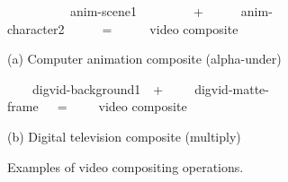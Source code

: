 \begin{figure}[t]
\begin{minipage}{1.1in}
\vspace{-4pt}
\vspace{2pt}
\end{minipage}
\begin{minipage}{1.1in}
\vspace{-4pt}
\vspace{2pt}
\end{minipage}
\begin{minipage}{1.1in}
\vspace{-4pt}
\vspace{2pt}
\end{minipage}

{\small ~~~~~~~~~~anim-scene1~~~~~~~~~+~~~~~~anim-character2~~~~~~=~~~~~~video composite}

\begin{center}
\vspace{-3pt}
(a) Computer animation composite (alpha-under)
\end{center} \vspace{3pt}

\begin{minipage}{1.1in}
\vspace{2pt}
\end{minipage}
\begin{minipage}{1.1in}
\vspace{2pt}
\end{minipage}
\begin{minipage}{1.1in}
\vspace{2pt}
\end{minipage}

{\small ~~~~digvid-background1~~+~~~~~digvid-matte-frame~~~=~~~~~video composite}

\begin{center}
\vspace{-3pt}
(b) Digital television composite (multiply)
\end{center}
\vspace{-3pt}
\caption{Examples of video compositing operations.\protect\label{fig:videos}}
\vspace{-3pt}
\end{figure}

